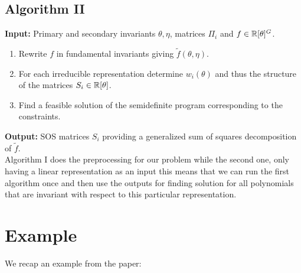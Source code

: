 \documentclass[]{article}
\begin{document}
\subsection*{Algorithm II}

\textbf{Input: } Primary and secondary invariants $\theta,\eta$, matrices $\Pi_i$ and $f \in \mathbb R[\theta]^G$.

\begin{enumerate}
    \item Rewrite $f$ in fundamental invariants giving $\tilde{f}(\theta,\eta)$.
    \item For each irreducible representation determine $w_i(\theta)$ and thus the structure of the matrices $S_i\in \mathbb R[\theta]$. %
    \item Find a feasible solution of the semidefinite program corresponding to the constraints.
\end{enumerate}
\noindent
\textbf{Output:} SOS matrices $S_i$ providing a generalized sum of squares decomposition of $\tilde{f}$.\\



Algorithm I does the preprocessing for our problem while the second one, only having a linear representation as an input
this means that we can run the first algorithm once and then 
use the outputs for finding solution for 
all polynomials that are invariant with respect to this particular representation.


\section*{Example}
We recap an example from the paper:
\end{document}
